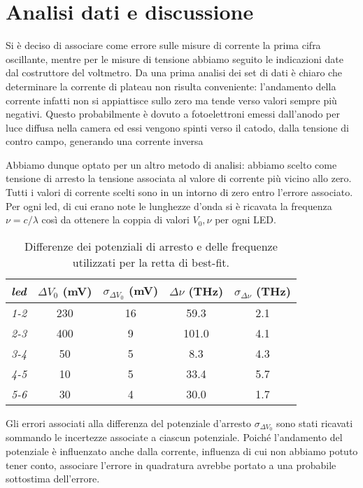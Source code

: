 \documentclass[9pt,a4paper,twocolumn,twoside]{tau-class/tau}
\begin{document}
\section{Analisi dati e discussione}
Si è deciso di associare come errore sulle misure di corrente la prima cifra oscillante, mentre per le misure di tensione abbiamo seguito le indicazioni date dal costruttore del voltmetro.
Da una prima analisi dei set di dati è chiaro che determinare la corrente di plateau non risulta conveniente: l'andamento della corrente infatti non si appiattisce sullo zero ma tende verso valori sempre più negativi. Questo probabilmente è dovuto a fotoelettroni emessi dall'anodo per luce diffusa nella camera ed essi vengono spinti verso il catodo, dalla tensione di contro campo, generando una corrente inversa %

Abbiamo dunque optato per un altro metodo di analisi: abbiamo scelto come tensione di arresto la tensione associata al valore di corrente più vicino allo zero. Tutti i valori di corrente scelti sono in un intorno di zero entro l'errore associato. Per ogni led, di cui erano note le lunghezze d'onda si è ricavata la frequenza \(\nu = c/\lambda\) così da ottenere la coppia di valori \(V_0,\nu\) per ogni LED. 

\begin{table}[H]
            \centering
            \begin{tabular}{lcccc}
                \toprule
                 \textit{led}&\(\Delta V_0\) (mV) & \(\sigma_{\Delta V_0}\) (mV) & \(\Delta\nu\) (THz) &  \(\sigma_{\Delta \nu}\) (THz)\\
                \midrule
                \textit{1-2} &230 & 16 & 59.3& 2.1 \\
                \textit{2-3} &400 & 9  & 101.0 & 4.1 \\
                \textit{3-4} &50 & 5  & 8.3&  4.3 \\
                \textit{4-5} &10  & 5  & 33.4 & 5.7 \\
                \textit{5-6} &30  & 4  & 30.0 & 1.7 \\
                \bottomrule  
            \end{tabular}
            \caption{Differenze dei potenziali di arresto e delle frequenze utilizzati per la retta di best-fit.}
\end{table}
Gli errori associati alla differenza del potenziale d'arresto \(\sigma_{\Delta V_0}\) sono stati ricavati sommando le incertezze associate a ciascun potenziale. Poiché l'andamento del potenziale è influenzato anche dalla corrente, influenza di cui non abbiamo potuto tener conto, associare l'errore in quadratura avrebbe portato a una probabile sottostima dell'errore.
\end{document}
